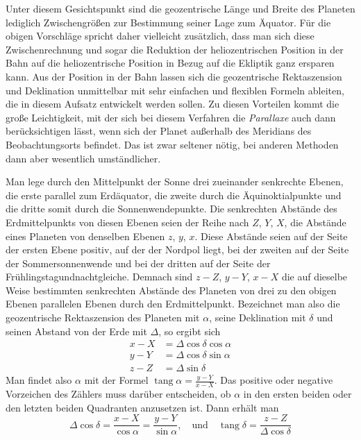 Unter diesem Gesichtspunkt sind die geozentrische Länge und Breite des
Planeten lediglich Zwischengrößen zur Bestimmung seiner Lage zum Äquator.
Für die obigen Vorschläge spricht daher vielleicht zusätzlich, dass man sich
diese Zwischenrechnung und sogar die Reduktion der heliozentrischen Position
in der Bahn auf die heliozentrische Position in Bezug auf die Ekliptik ganz
ersparen kann. Aus der Position in der Bahn lassen sich die geozentrische
Rektaszension und Deklination unmittelbar mit sehr einfachen und flexiblen
Formeln ableiten, die in diesem Aufsatz entwickelt werden sollen. Zu diesen
Vorteilen kommt die große Leichtigkeit, mit der sich bei diesem Verfahren die
\textit{Parallaxe} auch dann berücksichtigen lässt, wenn sich der Planet außerhalb
des Meridians des Beobachtungsorts befindet. Das ist zwar seltener nötig, bei
anderen Methoden dann aber wesentlich umständlicher.

Man lege durch den Mittelpunkt der Sonne drei zueinander senkrechte Ebenen,
die erste parallel zum Erdäquator, die zweite durch die Äquinoktialpunkte
und die dritte somit durch die Sonnenwendepunkte. Die senkrechten Abstände
des Erdmittelpunkts von diesen Ebenen seien der Reihe nach $Z$, $Y$, $X$,
die Abstände eines Planeten von denselben Ebenen $z$, $y$, $x$. Diese Abstände
seien auf der Seite der ersten Ebene positiv, auf der der Nordpol liegt, bei
der zweiten auf der Seite der Sommersonnenwende und bei der dritten auf der
Seite der Frühlingstagundnachtgleiche. Demnach sind $z-Z$, $y-Y$, $x-X$ die auf
dieselbe Weise bestimmten senkrechten Abstände des Planeten von drei zu den
obigen Ebenen parallelen Ebenen durch den Erdmittelpunkt. Bezeichnet man also
die geozentrische Rektaszension des Planeten mit $\alpha$, seine Deklination mit
$\delta$ und seinen Abstand von der Erde mit $\Delta$, so ergibt sich
\[
\begin{aligned}
x-X&=\Delta\cos\delta\cos\alpha\\
y-Y&=\Delta\cos\delta\sin\alpha\\
z-Z&=\Delta\sin\delta
\end{aligned}
\]
%
Man findet also $\alpha$ mit der Formel $\operatorname{tang}\alpha=\frac{y-Y}{x-X}$.
Das positive oder negative Vorzeichen des Zählers muss darüber entscheiden,
ob $\alpha$ in den ersten beiden oder den letzten beiden Quadranten anzusetzen ist.
Dann erhält man
\[
\Delta\cos\delta=\frac{x-X}{\cos\alpha}=\frac{y-Y}{\sin\alpha},\quad
\text{und}\quad\operatorname{tang}\delta=\frac{z-Z}{\Delta\cos\delta}
\]

